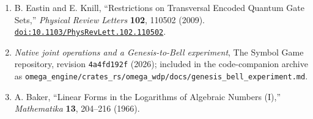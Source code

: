 \documentclass[
  11pt,
]{article}
\begin{document}
\begin{enumerate}
  \href{https://doi.org/10.1112/S0025579300003843}{\nolinkurl{doi:10.1112/S0025579300003843}}.
\item
  B. Eastin and E. Knill, ``Restrictions on Transversal Encoded Quantum
  Gate Sets,'' \emph{Physical Review Letters} \textbf{102}, 110502
  (2009).
  \href{https://doi.org/10.1103/PhysRevLett.102.110502}{\nolinkurl{doi:10.1103/PhysRevLett.102.110502}}.
\item
  \emph{Native joint operations and a Genesis-to-Bell experiment}, The
  Symbol Game repository, revision
  \texttt{4\allowbreak{}a\allowbreak{}4\allowbreak{}f\allowbreak{}d\allowbreak{}1\allowbreak{}9\allowbreak{}2\allowbreak{}f}
  (2026); included in the code-companion archive as
  \texttt{o\allowbreak{}m\allowbreak{}e\allowbreak{}g\allowbreak{}a\allowbreak{}\_\allowbreak{}e\allowbreak{}n\allowbreak{}g\allowbreak{}i\allowbreak{}n\allowbreak{}e\allowbreak{}/\allowbreak{}c\allowbreak{}r\allowbreak{}a\allowbreak{}t\allowbreak{}e\allowbreak{}s\allowbreak{}\_\allowbreak{}r\allowbreak{}s\allowbreak{}/\allowbreak{}o\allowbreak{}m\allowbreak{}e\allowbreak{}g\allowbreak{}a\allowbreak{}\_\allowbreak{}w\allowbreak{}d\allowbreak{}p\allowbreak{}/\allowbreak{}d\allowbreak{}o\allowbreak{}c\allowbreak{}s\allowbreak{}/\allowbreak{}g\allowbreak{}e\allowbreak{}n\allowbreak{}e\allowbreak{}s\allowbreak{}i\allowbreak{}s\allowbreak{}\_\allowbreak{}b\allowbreak{}e\allowbreak{}l\allowbreak{}l\allowbreak{}\_\allowbreak{}e\allowbreak{}x\allowbreak{}p\allowbreak{}e\allowbreak{}r\allowbreak{}i\allowbreak{}m\allowbreak{}e\allowbreak{}n\allowbreak{}t\allowbreak{}.\allowbreak{}m\allowbreak{}d}.
\item
  A. Baker, ``Linear Forms in the Logarithms of Algebraic Numbers (I),''
  \emph{Mathematika} \textbf{13}, 204--216 (1966).
\end{enumerate}
\end{document}
